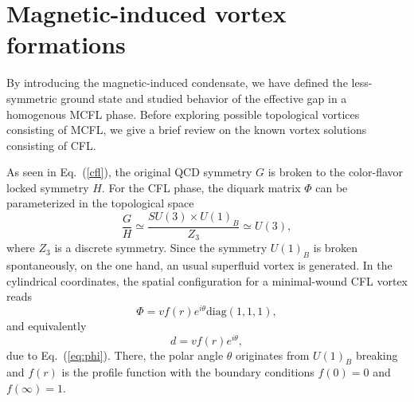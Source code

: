 \documentclass[prd, showpacs,nofootinbib,amsmath,amssymb]{revtex4}
\begin{document}
\section{Magnetic-induced vortex formations}
\label{sec:3}

By introducing the magnetic-induced condensate, we have defined the less-symmetric ground state and
studied behavior of the effective gap in a homogenous MCFL phase. Before exploring possible topological
vortices consisting of MCFL, we give a brief review on the known vortex solutions consisting of CFL.

As seen in Eq.~(\ref{cfl}), the original QCD symmetry $G$ is broken to
the color-flavor locked symmetry $H$.
For the CFL phase, the diquark matrix $\Phi$ can be parameterized in the
topological space
\begin{equation}
  \label{eq:cflvortexgroup}
  \frac{G}{H} \simeq \frac{SU(3) \times U(1)_B}{Z_3}  \simeq U(3),
\end{equation}
where $Z_3$ is a discrete symmetry.
Since the symmetry $U(1)_B$ is broken spontaneously, on the one hand, an usual superfluid vortex is generated.
In the cylindrical coordinates, the spatial configuration for a minimal-wound CFL vortex reads
\begin{equation}
  \label{eq:bvortexphi}
\Phi =vf(r)e^{i \theta} \text{diag}(1,1,1),
\end{equation}
and equivalently
\begin{equation}
 d = vf(r)e^{i\theta}, \label{eq:bvortex}\end{equation}
due to Eq.~(\ref{eq:phi}). There, the polar angle $\theta$ originates from $U(1)_B$ breaking and
$f(r)$ is the profile function with the boundary
conditions $f(0) = 0$ and $f(\infty) =1$.
\end{document}
